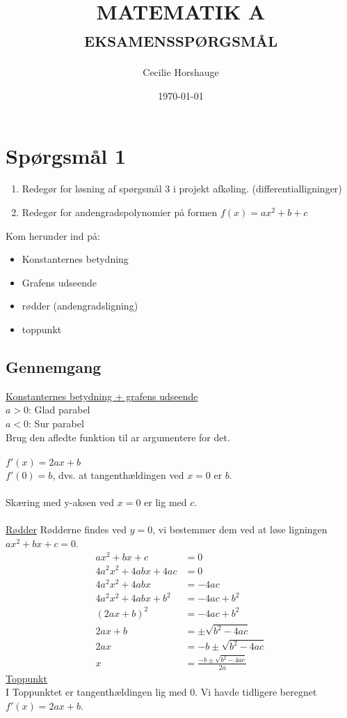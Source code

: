 \documentclass[a4paper, 11pt]{article}
\title{{\large \textsc{MATEMATIK A\\ eksamensspørgsmål}}}
\author{Cecilie Horshauge}
\date{\today}
\begin{document}
\maketitle
\noindent 

\section*{Spørgsmål 1} 
\begin{enumerate}[label=\alph*)]
    \item Redegør for løsning af spørgsmål 3 i projekt afkøling. (differentialligninger)
    \item Redegør for andengradspolynomier på formen \(f(x)=ax^2+b+c\)
\end{enumerate}
\indent \indent Kom herunder ind på:
\begin{itemize}
    \item Konstanternes betydning
    \item Grafens udseende
    \item rødder (andengradsligning)
    \item toppunkt
\end{itemize}
\subsection*{Gennemgang}
\underline{Konstanternes betydning + grafens udseende}\\
\(a>0\): Glad parabel\\
\(a<0\): Sur parabel\\
Brug den afledte funktion til ar argumentere for det. \\\\
\(f'(x)=2ax+b\)\\
\(f'(0)=b\), dvs. at tangenthældingen ved \(x=0\) er \(b\).\\\\
Skæring med y-aksen ved \(x=0\) er lig med \(c\).\\\\
\underline{Rødder}
Rødderne findes ved \(y=0\), vi bestemmer dem ved at løse ligningen \(ax^2+bx+c=0\).
\begin{align}
    ax^2+bx+c&=0\\
    4a^2x^2+4abx+4ac&=0\\
    4a^2x^2+4abx&=-4ac\\
    4a^2x^2+4abx+b^2&=-4ac+b^2\\
    (2ax+b)^2&=-4ac+b^2\\
    2ax+b&= \pm \sqrt{b^2-4ac}\\
    2ax &= -b \pm \sqrt{b^2-4ac}\\
    x &= \frac{-b \pm \sqrt{b^2-4ac}}{2a}
\end{align}
\underline{Toppunkt}\\
I Toppunktet er tangenthældingen lig med 0. Vi havde tidligere beregnet \(f'(x)=2ax+b\).
\end{document}

